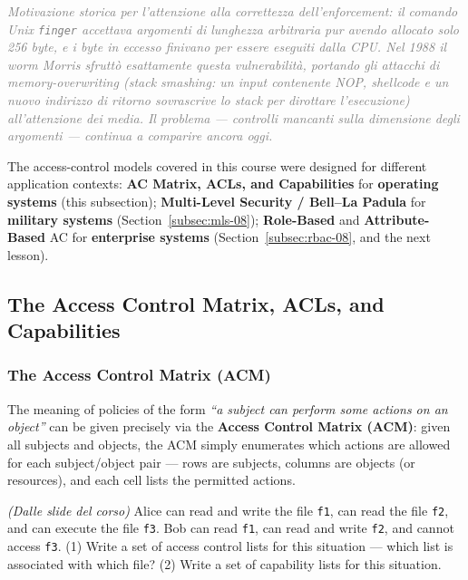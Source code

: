 \documentclass[12pt, a4paper]{article}
\newcounter{esercizio}[section]
\begin{document}
\textcolor{gray}{\textit{Motivazione storica per l'attenzione alla correttezza dell'enforcement: il comando Unix \texttt{finger} accettava argomenti di lunghezza arbitraria pur avendo allocato solo 256 byte, e i byte in eccesso finivano per essere eseguiti dalla CPU. Nel 1988 il worm Morris sfruttò esattamente questa vulnerabilità, portando gli attacchi di memory-overwriting (\textit{stack smashing}: un input contenente NOP, shellcode e un nuovo indirizzo di ritorno sovrascrive lo stack per dirottare l'esecuzione) all'attenzione dei media. Il problema — controlli mancanti sulla dimensione degli argomenti — continua a comparire ancora oggi.}}

The access-control models covered in this course were designed for different application contexts: \textbf{AC Matrix, ACLs, and Capabilities} for \textbf{operating systems} (this subsection); \textbf{Multi-Level Security / Bell--La Padula} for \textbf{military systems} (Section~\ref{subsec:mls-08}); \textbf{Role-Based} and \textbf{Attribute-Based} AC for \textbf{enterprise systems} (Section~\ref{subsec:rbac-08}, and the next lesson).

\subsection{The Access Control Matrix, ACLs, and Capabilities}

\subsubsection{The Access Control Matrix (ACM)}
The meaning of policies of the form \textit{``a subject can perform some actions on an object''} can be given precisely via the \textbf{Access Control Matrix (ACM)}: given all subjects and objects, the ACM simply enumerates which actions are allowed for each subject/object pair --- rows are subjects, columns are objects (or resources), and each cell lists the permitted actions.

\begin{tcolorbox}[colback=lightergray!10, colframe=tocsec, title=\textbf{Esercizio \theesercizio}]
\textit{(Dalle slide del corso)} Alice can read and write the file \texttt{f1}, can read the file \texttt{f2}, and can execute the file \texttt{f3}. Bob can read \texttt{f1}, can read and write \texttt{f2}, and cannot access \texttt{f3}. (1) Write a set of access control lists for this situation --- which list is associated with which file? (2) Write a set of capability lists for this situation.
\end{tcolorbox}
\end{document}

